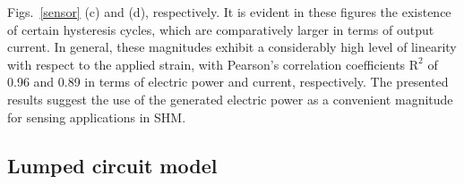 \documentclass[a4paper,fleqn]{cas-sc}
\begin{document}
Figs.~\ref{sensor} (c) and (d), respectively. It is evident in these figures the existence of certain hysteresis cycles, which are comparatively larger in terms of output current. In general, these magnitudes exhibit a considerably high level of linearity with respect to the applied strain, with Pearson's correlation coefficients $\mathrm{R^2}$ of 0.96 and 0.89 in terms of electric power and current, respectively. The presented results suggest the use of the generated electric power as a convenient magnitude for sensing applications in SHM.


\subsection{Lumped circuit model}\label{Sect23}
\end{document}
